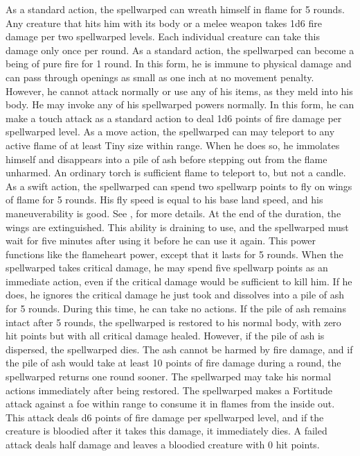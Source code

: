  As a standard action, the spellwarped can wreath himself in flame for 5 rounds. Any creature that hits him with its body or a melee weapon takes 1d6 fire damage per two spellwarped levels. Each individual creature can take this damage only once per round.
 As a standard action, the spellwarped can become a being of pure fire for 1 round. In this form, he is immune to physical damage and can pass through openings as small as one inch at no movement penalty. However, he cannot attack normally or use any of his items, as they meld into his body. He may invoke any of his spellwarped powers normally. In this form, he can make a touch attack as a standard action to deal 1d6 points of fire damage per spellwarped level.
 As a move action, the spellwarped can may teleport to any active flame of at least Tiny size within \rngmed range. When he does so, he immolates himself and disappears into a pile of ash before stepping out from the flame unharmed. An ordinary torch is sufficient flame to teleport to, but not a candle.
 As a swift action, the spellwarped can spend two spellwarp points to fly on wings of flame for 5 rounds. His fly speed is equal to his base land speed, and his maneuverability is good. See , for more details. At the end of the duration, the wings are extinguished. This ability is draining to use, and the spellwarped must wait for five minutes after using it before he can use it again.
 This power functions like the flameheart power, except that it lasts for 5 rounds.
 When the spellwarped takes critical damage, he may spend five spellwarp points as an immediate action, even if the critical damage would be sufficient to kill him. If he does, he ignores the critical damage he just took and dissolves into a pile of ash for 5 rounds. During this time, he can take no actions. If the pile of ash remains intact after 5 rounds, the spellwarped is restored to his normal body, with zero hit points but with all critical damage healed. However, if the pile of ash is dispersed, the spellwarped dies. The ash cannot be harmed by fire damage, and if the pile of ash would take at least 10 points of fire damage during a round, the spellwarped returns one round sooner. The spellwarped may take his normal actions immediately after being restored.
 The spellwarped makes a Fortitude attack against a foe within \rngclose range to consume it in flames from the inside out. This attack deals d6 points of fire damage per spellwarped level, and if the creature is bloodied after it takes this damage, it immediately dies. A failed attack deals half damage and leaves a bloodied creature with 0 hit points.

